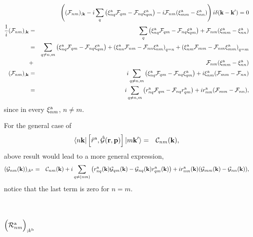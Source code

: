 \documentclass[floatfix,prb,aps,superscriptaddress,11pt,preprint]{revtex4}
\begin{document}
\begin{eqnarray}\label{a.7}
&&
\left(
({\mathbf{\cal F}}_{nm})_{;\mathbf{k}}
-i
\sum_{q}
\left(
\xi_{nq}^{\mathrm{a}}
{\mathbf{\cal F}}_{qm}
-
{\mathbf{\cal F}}_{nq}
\xi_{qm}^{\mathrm{a}}
\right)
-i
{\mathbf{\cal F}}_{nm}(\xi_{mm}^{\mathrm{a}}-\xi_{nn}^{\mathrm{a}})
\right) i\delta(\mathbf{k}-\mathbf{k}')
=0
\nonumber\\
\frac{1}{i}({\mathbf{\cal F}}_{nm})_{;\mathbf{k}}
&=&
\sum_{q}
\left(
\xi_{nq}^{\mathrm{a}}
{\mathbf{\cal F}}_{qm}
-
{\mathbf{\cal F}}_{nq}
\xi_{qm}^{\mathrm{a}}
\right)
+
{\mathbf{\cal F}}_{nm}(\xi_{mm}^{\mathrm{a}}-\xi_{nn}^{\mathrm{a}})
\nonumber\\
&=&
\sum_{q\ne n,m}
\left(
\xi_{nq}^{\mathrm{a}}
{\mathbf{\cal F}}_{qm}
-
{\mathbf{\cal F}}_{nq}
\xi_{qm}^{\mathrm{a}}
\right)
+
\left(
\xi_{nn}^{\mathrm{a}}
{\mathbf{\cal F}}_{nm}
-
{\mathbf{\cal F}}_{nn}
\xi_{nm}^{\mathrm{a}}
\right)_{q=n}
+
\left(
\xi_{nm}^{\mathrm{a}}
{\mathbf{\cal F}}_{mm}
-
{\mathbf{\cal F}}_{nm}
\xi_{mm}^{\mathrm{a}}
\right)_{q=m}
\nonumber\\
&+&
{\mathbf{\cal F}}_{nm}(\xi_{mm}^{\mathrm{a}}-\xi_{nn}^{\mathrm{a}})
\nonumber\\
({\mathbf{\cal F}}_{nm})_{;\mathbf{k}}
&=&
i\sum_{q\ne n,m}
\left(
\xi_{nq}^{\mathrm{a}}
{\mathbf{\cal F}}_{qm}
-
{\mathbf{\cal F}}_{nq}
\xi_{qm}^{\mathrm{a}}
\right)
+i\xi_{nm}^{\mathrm{a}}({\mathbf{\cal F}}_{mm}-{\mathbf{\cal F}}_{nn})
\nonumber\\
&=&
i\sum_{q\ne n,m}
\left(
r_{nq}^{\mathrm{a}}
{\mathbf{\cal F}}_{qm}
-
{\mathbf{\cal F}}_{nq}
r_{qm}^{\mathrm{a}}
\right)
+ir_{nm}^{\mathrm{a}}({\mathbf{\cal F}}_{mm}-{\mathbf{\cal F}}_{nn})
,
\end{eqnarray} 
since in every $\xi_{nm}^{\mathrm{a}}$, $n\ne m$. 

For the general
case of
\begin{eqnarray}\label{a.8}
\langle n\mathbf{k} |
\left[\hat r^{\mathrm{a}},\hat{{\mathbf{\cal G}}}(\mathbf{r},\mathbf{p})\right]
| m\mathbf{k}' \rangle
&=&
{\mathbf{\cal C}}_{nm}(\mathbf{k})
,
\end{eqnarray}
above result would lead to a more general expression, 
\begin{eqnarray}\label{a.9}
({\mathbf{\cal G}}_{nm}(\mathbf{k}))_{;k^{\mathrm{a}}}
&=&
{\mathbf{\cal C}}_{nm}(\mathbf{k})
+
i\sum_{q\ne(nm)}
\left(
r_{nq}^{\mathrm{a}} (\mathbf{k})
{\mathbf{\cal G}}_{qm}(\mathbf{k})
-
{\mathbf{\cal G}}_{nq}(\mathbf{k})
r_{qm}^{\mathrm{a}} (\mathbf{k})
\right)
+ir_{nm}^{\mathrm{a}} (\mathbf{k}) ({\mathbf{\cal G}}_{mm}(\mathbf{k})-{\mathbf{\cal G}}_{nn}(\mathbf{k}))
,
\nonumber\\
\end{eqnarray}
notice that the last term is zero for $n=m$.

\section{$\Big({\cal R}^{\mathrm{a}}_{nm}\Big)_{;k^{\mathrm{b}}}$}\label{calr}
\end{document}
